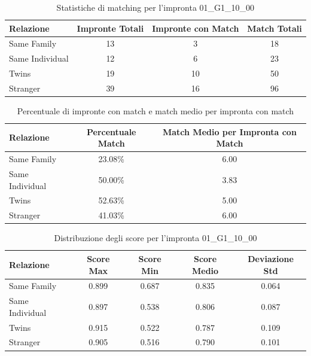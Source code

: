 \begin{table}[htbp]
\centering
\caption{Statistiche di matching per l'impronta 01\_G1\_10\_00}
\label{tab:results_01_G1_10_00}
\begin{tabular}{|l|c|c|c|}
\hline
\textbf{Relazione} & \textbf{Impronte Totali} & \textbf{Impronte con Match} & \textbf{Match Totali} \\
\hline
Same Family & 13 & 3 & 18 \\
\hline
Same Individual & 12 & 6 & 23 \\
\hline
Twins & 19 & 10 & 50 \\
\hline
Stranger & 39 & 16 & 96 \\
\hline
\end{tabular}
\end{table}


\begin{table}[htbp]
\centering
\caption{Percentuale di impronte con match e match medio per impronta con match}
\label{tab:match_percentage_01_G1_10_00}
\begin{tabular}{|l|c|c|}
\hline
\textbf{Relazione} & \textbf{Percentuale Match} & \textbf{Match Medio per Impronta con Match} \\
\hline
Same Family & 23.08\% & 6.00 \\
\hline
Same Individual & 50.00\% & 3.83 \\
\hline
Twins & 52.63\% & 5.00 \\
\hline
Stranger & 41.03\% & 6.00 \\
\hline
\end{tabular}
\end{table}


\begin{table}[htbp]
\centering
\caption{Distribuzione degli score per l'impronta 01\_G1\_10\_00}
\label{tab:scores_01_G1_10_00}
\begin{tabular}{|l|c|c|c|c|}
\hline
\textbf{Relazione} & \textbf{Score Max} & \textbf{Score Min} & \textbf{Score Medio} & \textbf{Deviazione Std} \\
\hline
Same Family & 0.899 & 0.687 & 0.835 & 0.064 \\
\hline
Same Individual & 0.897 & 0.538 & 0.806 & 0.087 \\
\hline
Twins & 0.915 & 0.522 & 0.787 & 0.109 \\
\hline
Stranger & 0.905 & 0.516 & 0.790 & 0.101 \\
\hline
\end{tabular}
\end{table}

